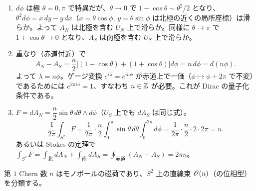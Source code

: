 \begin{enumerate}
  \item $d\phi$ は極 $\theta=0,\pi$ で特異だが、$\theta\to0$ で $1-\cos\theta\sim\theta^2/2$ となり、$\theta^2d\phi=x\,dy-y\,dx$（$x=\theta\cos\phi$, $y=\theta\sin\phi$ は北極の近くの局所座標）は滑らか。よって $A_N$ は北極を含む $U_N$ 上で滑らか。同様に $\theta\to\pi$ で $1+\cos\theta\to0$ となり、$A_S$ は南極を含む $U_S$ 上で滑らか。
  \item 重なり（赤道付近）で
  \[
    A_N-A_S=\frac n2\bigl[(1-\cos\theta)+(1+\cos\theta)\bigr]d\phi=n\,d\phi=d(n\phi).
  \]
  よって $\lambda=n\phi$。ゲージ変換 $e^{i\lambda}=e^{in\phi}$ が赤道上で一価（$\phi\mapsto\phi+2\pi$ で不変）であるためには $e^{2\pi in}=1$、すなわち $n\in\mathbb{Z}$ が必要。これが Dirac の量子化条件である。
  \item $F=dA_N=\dfrac n2\sin\theta\,d\theta\wedge d\phi$（$U_S$ 上でも $dA_S$ は同じ式）。
  \[
    \frac1{2\pi}\int_{S^2}F=\frac1{2\pi}\cdot\frac n2\int_0^{\pi}\sin\theta\,d\theta\int_0^{2\pi}d\phi=\frac1{2\pi}\cdot\frac n2\cdot2\cdot2\pi=n.
  \]
  あるいは Stokes の定理で $\int_{S^2}F=\int_{\text{北}}dA_N+\int_{\text{南}}dA_S=\oint_{\text{赤道}}(A_N-A_S)=2\pi n$。
\end{enumerate}
第 $1$ Chern 数 $n$ はモノポールの磁荷であり、$S^2$ 上の直線束 $\mathscr{O}(n)$（の位相型）を分類する。

